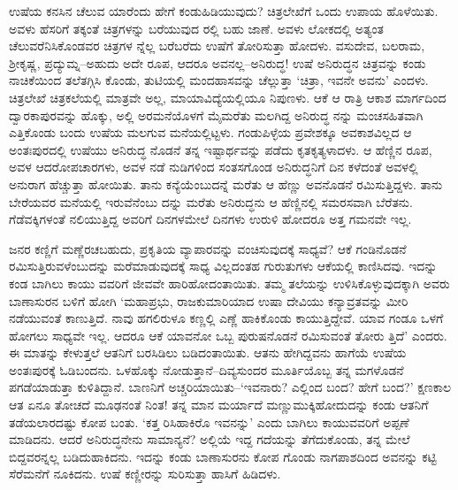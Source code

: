 ಉಷೆಯ ಕನಸಿನ ಚೆಲುವ ಯಾರೆಂದು ಹೇಗೆ ಕಂಡುಹಿಡಿಯುವುದು? ಚಿತ್ರಲೇಖೆಗೆ ಒಂದು ಉಪಾಯ ಹೊಳೆಯಿತು. ಅವಳು ಹೆಸರಿಗೆ ತಕ್ಕಂತೆ ಚಿತ್ರಗಳನ್ನು ಬರೆಯುವುದ ರಲ್ಲಿ ಬಹು ಜಾಣೆ. ಅವಳು ಲೋಕದಲ್ಲಿ ಅತ್ಯಂತ ಚೆಲುವರೆನಿಸಿಕೊಂಡವರ ಚಿತ್ರಗಳ ನ್ನೆಲ್ಲ ಬರೆಬರೆದು ಉಷೆಗೆ ತೋರಿಸುತ್ತಾ ಹೋದಳು. ವಸುದೇವ, ಬಲರಾಮ, ಶ್ರೀಕೃಷ್ಣ, ಪ್ರದ್ಯುಮ್ನ–ಅಹುದು ಅದೇ ರೂಪ, ಆದರೂ ಅವನಲ್ಲ–ಅನಿರುದ್ಧ! ಉಷೆ ಅನಿರುದ್ಧನ ಚಿತ್ರವನ್ನು ಕಂಡು ನಾಚಿಕೆಯಿಂದ ತಲೆತಗ್ಗಿಸಿ ಕೊಂಡು, ತುಟಿಯಲ್ಲಿ ಮಂದಹಾಸವನ್ನು ಚೆಲ್ಲುತ್ತಾ ‘ಚಿತ್ರಾ, ಇವನೇ ಅವನು’ ಎಂದಳು. ಚಿತ್ರಲೇಖೆ ಚಿತ್ರಕಲೆಯಲ್ಲಿ ಮಾತ್ರವೇ ಅಲ್ಲ, ಮಾಯಾವಿದ್ಯೆಯಲ್ಲಿಯೂ ನಿಪುಣಳು. ಆಕೆ ಆ ರಾತ್ರಿ ಆಕಾಶ ಮಾರ್ಗದಿಂದ ದ್ವಾರಕಾಪುರವನ್ನು ಹೊಕ್ಕು, ಅಲ್ಲಿ ಅರಮನೆಯೊಳಗೆ ಮೈಮರೆತು ಮಲಗಿದ್ದ ಅನಿರುದ್ಧ ನನ್ನು ಮಂಚಸಹಿತವಾಗಿ ಎತ್ತಿಕೊಂಡು ಬಂದು ಉಷೆಯ ಮಲಗುವ ಮನೆಯಲ್ಲಿಟ್ಟಳು. ಗಂಡುಪಿಳ್ಳೆಯ ಪ್ರವೇಶಕ್ಕೂ ಅವಕಾಶವಿಲ್ಲದ ಆ ಅಂತಃಪುರದಲ್ಲಿ ಉಷೆಯು ಅನಿರುದ್ಧ ನೊಡನೆ ತನ್ನ ಇಷ್ಟಾರ್ಥವನ್ನು ಪಡೆದು ಕೃತಕೃತ್ಯಳಾದಳು. ಆ ಹೆಣ್ಣಿನ ರೂಪ, ಅವಳ ಆದರೋಪಚಾರಗಳು, ಅವಳ ನಡೆ ನುಡಿಗಳಿಂದ ಸಂತಸಗೊಂಡ ಅನಿರುದ್ಧನಿಗೆ ದಿನ ಕಳೆದಂತೆ ಅವಳಲ್ಲಿ ಅನುರಾಗ ಹೆಚ್ಚುತ್ತಾ ಹೋಯಿತು. ತಾನು ಕನ್ಯೆಯೆಂಬುದನ್ನೆ ಮರೆತು ಆ ಹೆಣ್ಣು ಅವನೊಡನೆ ರಮಿಸುತ್ತಿದ್ದಳು. ತಾನು ಬೇರೆಯವರ ಮನೆಯಲ್ಲಿ ಇರುವೆನೆಂಬು ದನ್ನು ಮರೆತು ಅನಿರುದ್ಧನು ಆ ಹೆಣ್ಣಿನಲ್ಲಿ ಸಮರಸವಾಗಿ ಬೆರೆತನು. ಗೆಡೆವಕ್ಕಿಗಳಂತೆ ನಲಿಯುತ್ತಿದ್ದ ಅವರಿಗೆ ದಿನಗಳಮೇಲೆ ದಿನಗಳು ಉರುಳಿ ಹೋದರೂ ಅತ್ತ ಗಮನವೇ ಇಲ್ಲ.

ಜನರ ಕಣ್ಣಿಗೆ ಮಣ್ಣೆರಚಬಹುದು, ಪ್ರಕೃತಿಯ ವ್ಯಾಪಾರವನ್ನು ವಂಚಿಸುವುದಕ್ಕೆ ಸಾಧ್ಯವೆ? ಆಕೆ ಗಂಡಿನೊಡನೆ ರಮಿಸುತ್ತಿರುವಳೆಂಬುದನ್ನು ಮರೆಮಾಡುವುದಕ್ಕೆ ಸಾಧ್ಯ ವಿಲ್ಲದಂತಹ ಗುರುತುಗಳು ಆಕೆಯಲ್ಲಿ ಕಾಣಿಸಿದವು. ಇದನ್ನು ಕಂಡ ಬಾಗಿಲು ಕಾಯು ವವರಿಗೆ ಜೀವವೇ ಹಾರಿಹೋದಂತಾಯಿತು. ತಮ್ಮ ತಲೆಯನ್ನು ಉಳಿಸಿಕೊಳ್ಳುವುದಕ್ಕಾಗಿ ಅವರು ಬಾಣಾಸುರನ ಬಳಿಗೆ ಹೋಗಿ ‘ಮಹಾಪ್ರಭು, ರಾಜಕುಮಾರಿಯಾದ ಉಷಾ ದೇವಿಯು ಕನ್ಯಾವ್ರತವನ್ನು ಮೀರಿ ನಡೆಯುವಂತೆ ಕಾಣುತ್ತಿದೆ. ನಾವು ಹಗಲಿರುಳೂ ಕಣ್ಣಲ್ಲಿ ಎಣ್ಣೆ ಹಾಕಿಕೊಂಡು ಕಾಯುತ್ತಿದ್ದೇವೆ. ಯಾವ ಗಂಡೂ ಒಳಗೆ ಹೋಗಲು ಸಾಧ್ಯವೇ ಇಲ್ಲ. ಆದರೂ ಆಕೆ ಯಾವನೋ ಒಬ್ಬ ಪುರುಷನೊಡನೆ ರಮಿಸುವಂತೆ ತೋರು ತ್ತಿದೆ’ ಎಂದರು. ಈ ಮಾತನ್ನು ಕೇಳುತ್ತಲೆ ಆತನಿಗೆ ಬರಸಿಡಿಲು ಬಡಿದಂತಾಯಿತು. ಆತನು ಹೇಗಿದ್ದವನು ಹಾಗೆಯೆ ಉಷೆಯ ಅಂತಃಪುರಕ್ಕೆ ಓಡಿಬಂದನು. ಒಳಹೊಕ್ಕು ನೋಡುತ್ತಾನೆ–ದಿವ್ಯಸುಂದರ ಮೂರ್ತಿಯೊಬ್ಬ ತನ್ನ ಮಗಳೊಡನೆ ಪಗಡೆಯಾಡುತ್ತಾ ಕುಳಿತಿದ್ದಾನೆ. ಬಾಣನಿಗೆ ಅಚ್ಚರಿಯಾಯಿತು–‘ಇವನಾರು? ಎಲ್ಲಿಂದ ಬಂದ? ಹೇಗೆ ಬಂದ?’ ಕ್ಷಣಕಾಲ ಆತ ಏನೂ ತೋಚದೆ ಮೂಢನಂತೆ ನಿಂತ! ತನ್ನ ಮಾನ ಮರ್ಯಾದೆ ಮಣ್ಣುಮುಕ್ಕಿಹೋದುದನ್ನು ಕಂಡು ಆತನಿಗೆ ತಡೆಯಲಾರದಷ್ಟು ಕೋಪ ಬಂತು. ‘ಕತ್ತ ರಿಸಿಹಾಕಿರೊ ಇವನನ್ನು’ ಎಂದು ಬಾಗಿಲು ಕಾಯುವವರಿಗೆ ಅಪ್ಪಣೆ ಮಾಡಿದನು. ಆದರೆ ಅನಿರುದ್ಧನೇನು ಸಾಮಾನ್ಯನೆ? ಅಲ್ಲಿಯೆ ಇದ್ದ ಗದೆಯನ್ನು ತೆಗೆದುಕೊಂಡು, ತನ್ನ ಮೇಲೆ ಬಿದ್ದವರನ್ನಲ್ಲ ಬಡಿದುಹಾಕಿದನು. ಇದನ್ನು ಕಂಡು ಬಾಣಾಸುರನು ಕೋಪ ಗೊಂಡು ನಾಗಪಾಶದಿಂದ ಅವನನ್ನು ಕಟ್ಟಿ ಸೆರೆಮನೆಗೆ ನೂಕಿದನು. ಉಷೆ ಕಣ್ಣೀರನ್ನು ಸುರಿಸುತ್ತಾ ಹಾಸಿಗೆ ಹಿಡಿದಳು.

